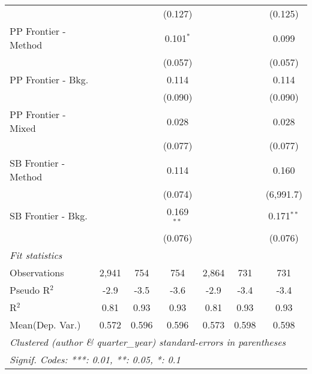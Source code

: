 \begin{tabular}{lcccccc}
                        &         &              & (0.127)      &         &              & (0.125)\\   
   PP Frontier - Method &         &              & 0.101$^{*}$  &         &              & 0.099\\   
                        &         &              & (0.057)      &         &              & (0.057)\\   
   PP Frontier - Bkg.   &         &              & 0.114        &         &              & 0.114\\   
                        &         &              & (0.090)      &         &              & (0.090)\\   
   PP Frontier - Mixed  &         &              & 0.028        &         &              & 0.028\\   
                        &         &              & (0.077)      &         &              & (0.077)\\   
   SB Frontier - Method &         &              & 0.114        &         &              & 0.160\\   
                        &         &              & (0.074)      &         &              & (6,991.7)\\   
   SB Frontier - Bkg.   &         &              & 0.169$^{**}$ &         &              & 0.171$^{**}$\\   
                        &         &              & (0.076)      &         &              & (0.076)\\   
   \midrule
   \emph{Fit statistics}\\
   Observations         & 2,941   & 754          & 754          & 2,864   & 731          & 731\\  
   Pseudo R$^2$         & -2.9    & -3.5         & -3.6         & -2.9    & -3.4         & -3.4\\  
   R$^2$                & 0.81    & 0.93         & 0.93         & 0.81    & 0.93         & 0.93\\  
Mean(Dep. Var.) & 0.572 & 0.596 & 0.596 & 0.573 & 0.598 & 0.598 \\
   \midrule \midrule
   \multicolumn{7}{l}{\emph{Clustered (author \& quarter\_year) standard-errors in parentheses}}\\
   \multicolumn{7}{l}{\emph{Signif. Codes: ***: 0.01, **: 0.05, *: 0.1}}\\
\end{tabular}
\par\endgroup
